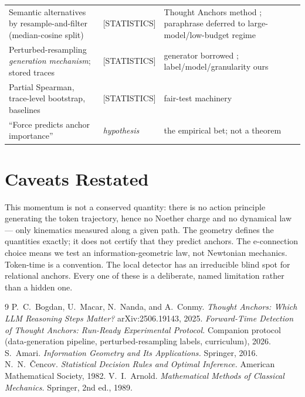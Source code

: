 \documentclass[11pt]{article}
\begin{document}
\begin{center}
\begin{tabular}{@{}p{} l p{}@{}}
Semantic alternatives by resample-and-filter (median-cosine split) & \textsf{[STATISTICS]} & Thought Anchors method \cite{bogdan2025thoughtanchors}; paraphrase deferred to large-model/low-budget regime \\
Perturbed-resampling \emph{generation mechanism}; stored traces & \textsf{[STATISTICS]} & generator borrowed \cite{g1protocol}; label/model/granularity ours \\
Partial Spearman, trace-level bootstrap, baselines & \textsf{[STATISTICS]} & fair-test machinery \\
``Force predicts anchor importance'' & \emph{hypothesis} & the empirical bet; not a theorem \\
\bottomrule
\end{tabular}
\end{center}

\section{Caveats Restated}

This momentum is not a conserved quantity: there is no action principle generating the token trajectory, hence no Noether charge and no dynamical law --- only kinematics measured along a given path. The geometry defines the quantities exactly; it does not certify that they predict anchors. The e-connection choice means we test an information-geometric law, not Newtonian mechanics. Token-time is a convention. The local detector has an irreducible blind spot for relational anchors. Every one of these is a deliberate, named limitation rather than a hidden one.

\begin{thebibliography}{9}
P.~C.~Bogdan, U.~Macar, N.~Nanda, and A.~Conmy.
\emph{Thought Anchors: Which LLM Reasoning Steps Matter?}
arXiv:2506.19143, 2025.
\emph{Forward-Time Detection of Thought Anchors: Run-Ready Experimental Protocol.}
Companion protocol (data-generation pipeline, perturbed-resampling labels, curriculum), 2026.
S.~Amari.
\emph{Information Geometry and Its Applications.}
Springer, 2016.
N.~N.~\v{C}encov.
\emph{Statistical Decision Rules and Optimal Inference.}
American Mathematical Society, 1982.
V.~I.~Arnold.
\emph{Mathematical Methods of Classical Mechanics.}
Springer, 2nd ed., 1989.
\end{thebibliography}
\end{document}
